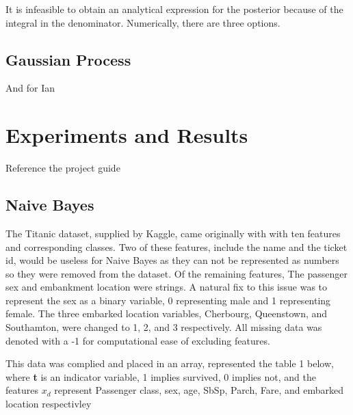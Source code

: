 \documentclass{article}
\begin{document}
It is infeasible to obtain an analytical expression for the posterior because of the integral in the denominator. Numerically, there are three options. 

\subsection{Gaussian Process}

And for Ian






\section{Experiments and Results}
Reference the project guide

\subsection{Naive Bayes}

The Titanic dataset, supplied by Kaggle, came originally with with ten features and corresponding classes. Two of these features, include the name and the ticket id, would be useless for Naive Bayes as they can not be represented as numbers so they were removed from the dataset. Of the remaining features, The passenger sex and embankment location were strings. A natural fix to this issue was to represent the sex as a binary variable, 0 representing male and 1 representing female. The three embarked location variables, Cherbourg, Queenstown, and Southamton, were changed to 1, 2, and 3 respectively. All missing data was denoted with a -1 for computational ease of excluding features.

This data was complied and placed in an array, represented the table 1 below, where \textbf{t} is an indicator variable, 1 implies survived, 0 implies not, and the features $x_d$ represent Passenger class, sex, age, SbSp, Parch, Fare, and embarked location respectivley
\end{document}
